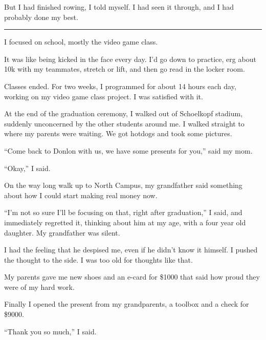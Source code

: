 But I had finished rowing, I told myself.  I had seen it through, and I had
probably done my best.

\plainfancybreak{12pt}{2}{* * *}

I focused on school, mostly the video game class.

It was like being kicked in the face every day.  I'd go down to practice, erg
about 10k with my teammates, stretch or lift, and then go read in the locker
room.

Classes ended.  For two weeks, I programmed for about 14 hours each day, working
on my video game class project.  I was satisfied with it.

At the end of the graduation ceremony, I walked out of Schoelkopf stadium,
suddenly unconcerned by the other students around me.  I walked straight to
where my parents were waiting.  We got hotdogs and took some pictures.  

``Come back to Donlon with us, we have some presents for you,'' said my mom. 

``Okay,'' I said.  

On the way long walk up to North Campus, my grandfather said something about how
I could start making real money now.

``I'm not so sure I'll be focusing on that, right after graduation,'' I said,
and immediately regretted it, thinking about him at my age, with a four year old
daughter.  My grandfather was silent.  

I had the feeling that he despised me, even if he didn't know it himself.  I
pushed the thought to the side.  I was too old for thoughts like that.

My parents gave me new shoes and an e-card for \$1000 that said how proud they
were of my hard work.  

Finally I opened the present from my grandparents, a toolbox and a check for \$9000.  

``Thank you so much,'' I said.
